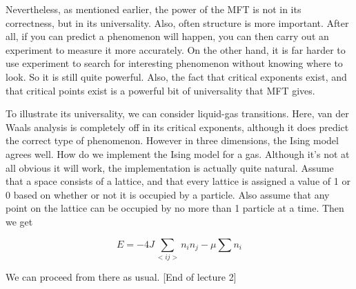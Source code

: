 \documentclass{article}
\theoremstyle{definition}
\begin{document}
Nevertheless, as mentioned earlier, the power of the MFT is not in its
correctness, but in its universality. Also, often structure is more important.
After all, if you can predict a phenomenon will happen, you can then carry out
an experiment to measure it more accurately. On the other hand, it is far harder
to use experiment to search for interesting phenomenon without knowing where to
look. So it is still quite powerful. Also, the fact that critical
exponents exist, and that critical points exist is a powerful bit of
universality that MFT gives.

To illustrate its universality, we can consider liquid-gas transitions. Here,
van der Waals analysis is completely off in its critical exponents, although it
does predict the correct type of phenomenon. However in three dimensions, the
Ising model agrees well. How do we implement the Ising model for a gas. Although
it's not at all obvious it will work, the implementation is actually quite
natural. Assume that a space consists of a lattice, and that every lattice is
assigned a value of 1 or 0 based on whether or not it is occupied by a particle.
Also assume that any point on the lattice can be occupied by no more than 1
particle at a time. Then we get

$$ E = -4J \sum_{<i j>} n_i n_j - \mu \sum n_i $$

We can proceed from there as usual. [End of lecture 2]
\end{document}

